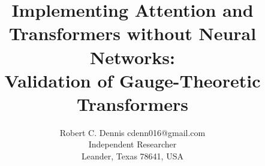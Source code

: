 \documentclass[twoside,11pt]{article}
\begin{document}

\title{Implementing Attention and Transformers without Neural Networks: \\ Validation of Gauge-Theoretic Transformers}


\author{\name Robert C. Dennis \email cdenn016@gmail.com \\
       \addr Independent Researcher\\
       \addr Leander, Texas 78641, USA}


\maketitle

\end{document}
